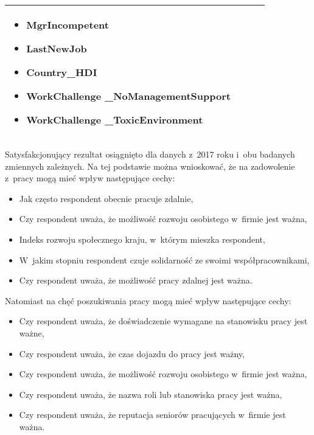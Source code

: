 \begin{minipage}{\textwidth}
\begin{table}[H]
\begin{center}
\begin{tabular}{|P{.1\textwidth}|P{.26\textwidth}|P{.26\textwidth}|P{.26\textwidth}|}
\begin{itemize}
                             \item MgrIncompetent
                             \item LastNewJob
                             \item Country\_HDI
                             \item WorkChallenge \_NoManagementSupport
                             \item WorkChallenge \_ToxicEnvironment
                         \end{itemize} \\
                         \hline
                     \end{tabular}
                 \end{center}
                 \raggedright\source{\ownwork}
                 \vspace{0.75cm}
             \end{table}
\end{minipage}

Satysfakcjonujący rezultat osiągnięto dla danych z~2017 roku i~obu badanych zmiennych zależnych.
Na tej podstawie można wnioskować, że na zadowolenie z~pracy mogą mieć wpływ następujące cechy:

\begin{itemize}
    \item Jak często respondent obecnie pracuje zdalnie,
    \item Czy respondent uważa, że możliwość rozwoju osobistego w~firmie jest ważna,
    \item Indeks rozwoju społecznego kraju, w~którym mieszka respondent,
    \item W~jakim stopniu respondent czuje solidarność ze swoimi współpracownikami,
    \item Czy respondent uważa, że możliwość pracy zdalnej jest ważna.
\end{itemize}

Natomiast na chęć poszukiwania pracy mogą mieć wpływ następujące cechy:

\begin{itemize}
    \item Czy respondent uważa, że doświadczenie wymagane na stanowisku pracy jest ważne,
    \item Czy respondent uważa, że czas dojazdu do pracy jest ważny,
    \item Czy respondent uważa, że możliwość rozwoju osobistego w~firmie jest ważna,
    \item Czy respondent uważa, że nazwa roli lub stanowiska pracy jest ważna,
    \item Czy respondent uważa, że reputacja seniorów pracujących w~firmie jest ważna.
\end{itemize}


